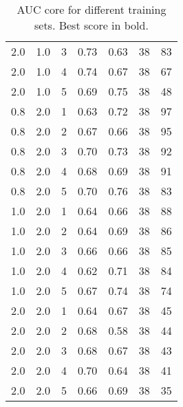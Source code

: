 \documentclass{book}
\begin{document}
\begin{table}[!h]
\begin{tabular}{C{1.5cm}  C{1.5cm}  c | C{2cm}  C{2cm} |  c  c}
  		2.0 & 1.0 & 3 & 0.73 & 0.63 & 38 & 83\\
  		2.0 & 1.0 & 4 & 0.74 & 0.67 & 38 & 67\\
  		2.0 & 1.0 & 5 & 0.69 & 0.75 & 38 & 48\\
  		0.8 & 2.0 & 1 & 0.63 & 0.72 & 38 & 97\\
  		0.8 & 2.0 & 2 & 0.67 & 0.66 & 38 & 95\\
  		0.8 & 2.0 & 3 & 0.70 & 0.73 & 38 & 92\\
  		0.8 & 2.0 & 4 & 0.68 & 0.69 & 38 & 91\\
  		0.8 & 2.0 & 5 & 0.70 & 0.76 & 38 & 83\\
  		1.0 & 2.0 & 1 & 0.64 & 0.66 & 38 & 88\\
  		1.0 & 2.0 & 2 & 0.64 & 0.69 & 38 & 86\\
  		1.0 & 2.0 & 3 & 0.66 & 0.66 & 38 & 85\\
  		1.0 & 2.0 & 4 & 0.62 & 0.71 & 38 & 84\\
  		1.0 & 2.0 & 5 & 0.67 & 0.74 & 38 & 74\\
  		2.0 & 2.0 & 1 & 0.64 & 0.67 & 38 & 45\\
  		2.0 & 2.0 & 2 & 0.68 & 0.58 & 38 & 44\\
  		2.0 & 2.0 & 3 & 0.68 & 0.67 & 38 & 43\\
  		2.0 & 2.0 & 4 & 0.70 & 0.64 & 38 & 41\\
  		2.0 & 2.0 & 5 & 0.66 & 0.69 & 38 & 35\\
  	\end{tabular}
  	\caption{AUC core for different training sets. Best score in bold.}
  	\label{table:exp_res}
  \end{table}
\end{document}
